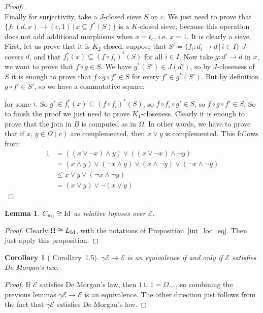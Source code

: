 \documentclass{article}
\newtheorem{Lemma}[theorem]{Lemma}
\newtheorem{corollary}[theorem]{Corollary}
\begin{document}
\begin{proof}
\\
Finally for surjectivity, take a $J$-closed sieve $S$ on $c$. We just need to prove that $\{f:(d,x)\xrightarrow{}(c,1)\,|\,x\subseteq f^*(S)\}$ is a $K$-closed sieve, because this operation does not add additional morphisms when $x=t_c$, i.e. $x=1$. It is clearly a sieve. First, let us prove that it is $K_2$-closed: suppose that $S'=\{f_i:d_i\xrightarrow{}d\,|\,i\in I\}$ $J$-covers $d$, and that $f_i^*(x)\subseteq(f\circ f_i)^*(S)$ for all $i\in I$. Now take $g:d'\xrightarrow{}d$ in $x$, we want to prove that $f\circ g\in S$. We have $g^*(S')\in J(d')$, so by $J$-closeness of $S$ it is enough to prove that $f\circ g\circ f'\in S$ for every $f'\in g^*(S')$. But by definition $g\circ f'\in S'$, so we have a commutative square:
\begin{center}
\end{center}
for some $i$. So $g'\in f_i^*(x)\subseteq(f\circ f_i)^*(S)$, so $f\circ f_i\circ g'\in S$, so $f\circ g\circ f'\in S$. So to finish the proof we just need to prove $K_1$-closeness. Clearly it is enough to prove that  the join in $B$ is computed as in $\Omega$. In other words, we have to prove that if $x,\,y\in \Omega(c)$ are complemented, then $x\lor y$ is complemented. This follows from:
\begin{align*}
    1 & =((x\lor\neg x)\land y)\lor ((x\lor\neg x)\land \neg y) \\
    & = (x\land y)\lor(\neg x\land y)\lor(x\land \neg y)\lor(\neg x\land \neg y)\\
    & \leq x\lor y\lor  (\neg x\land \neg y)\\
    & =(x\lor y)\lor\neg (x\lor y)
\end{align*}

\end{proof}

\begin{Lemma}\label{triv}
    $C_{\pi_\Omega}\cong \textup{Id}$ as relative toposes over $\mathcal{E}$.
\end{Lemma}
\begin{proof}
    Clearly $\Omega\cong L_{\textup{Id}}$, with the notations of Proposition~\ref{int_loc_eq}. Then just apply this proposition.
\end{proof}

\begin{corollary}[\cite{johnstone1980gleason} Corollary~1.5]
$\gamma\mathcal{E}\xrightarrow{}\mathcal{E}$ is an equivalence if and only if $\mathcal{E} $ satisfies De Morgan's law.
\end{corollary}
\begin{proof}
    If $\mathcal{E}$ satisfies De Morgan's law, then $1\sqcup 1=\Omega_{\neg\neg}$, so combining the previous lemmas $\gamma\mathcal{E}\xrightarrow{}\mathcal{E}$ is an equivalence. The other direction just follows from the fact that  $\gamma\mathcal{E}$ satisfies De Morgan's law.
\end{proof}
\end{document}
